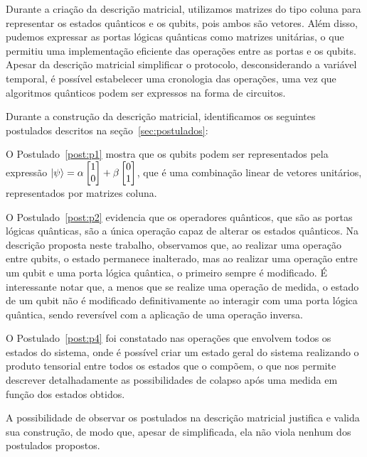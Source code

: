 Durante a criação da descrição matricial, utilizamos matrizes do tipo coluna para representar os estados quânticos e os qubits, pois ambos são vetores. Além disso, pudemos expressar as portas lógicas quânticas como matrizes unitárias, o que permitiu uma implementação eficiente das operações entre as portas e os qubits. Apesar da descrição matricial simplificar o protocolo, desconsiderando a variável temporal, é possível estabelecer uma cronologia das operações, uma vez que algoritmos quânticos podem ser expressos na forma de circuitos.

Durante a construção da descrição matricial, identificamos os seguintes postulados descritos na seção~\ref{sec:postulados}:

\begin{description}
\item O Postulado~\ref{post:p1} mostra que os qubits podem ser representados pela expressão $\ket{\psi} = \alpha \begin{bmatrix} 1 \\ 0 \end{bmatrix} + \beta \begin{bmatrix} 0 \\ 1 \end{bmatrix}$, que é uma combinação linear de vetores unitários, representados por matrizes coluna.
\item O Postulado~\ref{post:p2} evidencia que os operadores quânticos, que são as portas lógicas quânticas, são a única operação capaz de alterar os estados quânticos. Na descrição proposta neste trabalho, observamos que, ao realizar uma operação entre qubits, o estado permanece inalterado, mas ao realizar uma operação entre um qubit e uma porta lógica quântica, o primeiro sempre é modificado. É interessante notar que, a menos que se realize uma operação de medida, o estado de um qubit não é modificado definitivamente ao interagir com uma porta lógica quântica, sendo reversível com a aplicação de uma operação inversa.
\item O Postulado~\ref{post:p4} foi constatado nas operações que envolvem todos os estados do sistema, onde é possível criar um estado geral do sistema realizando o produto tensorial entre todos os estados que o compõem, o que nos permite descrever detalhadamente as possibilidades de colapso após uma medida em função dos estados obtidos.
\end{description}

A possibilidade de observar os postulados na descrição matricial justifica e valida sua construção, de modo que, apesar de simplificada, ela não viola nenhum dos postulados propostos.

